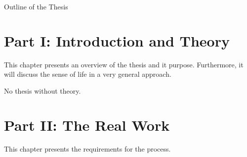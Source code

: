 \clearemptydoublepage

{}

\begin{center}
	\huge{Outline of the Thesis}
\end{center}




\section*{Part I: Introduction and Theory}

  \vspace{1mm}

\noindent  This chapter presents an overview of the thesis and it purpose. Furthermore, it will discuss the sense of life in a very general approach.  \\

  \vspace{1mm}

\noindent  No thesis without theory.   \\

\section*{Part II: The Real Work}

  \vspace{1mm}

\noindent  This chapter presents the requirements for the process.
